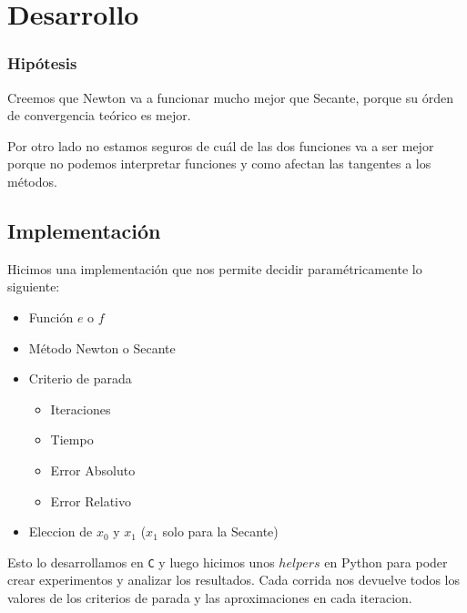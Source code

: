 \section{Desarrollo}

\subsubsection{Hipótesis}
Creemos que Newton va a funcionar mucho mejor que Secante, porque su órden de
convergencia teórico es mejor.

Por otro lado no estamos seguros de cuál de las dos funciones va a ser mejor
porque no podemos interpretar funciones y como afectan las tangentes a los
métodos.

\subsection{Implementación}

Hicimos una implementación que nos permite decidir paramétricamente lo siguiente:

\begin{itemize}
    \item Función $e$ o $f$
    \item Método Newton o Secante
    \item Criterio de parada
    \begin{itemize}
        \item Iteraciones
        \item Tiempo
        \item Error Absoluto
        \item Error Relativo
    \end{itemize}
    \item Eleccion de $x_0$ y $x_1$ ($x_1$ solo para la Secante)
\end{itemize}

Esto lo desarrollamos en \verb|C| y luego hicimos unos $helpers$ en Python para poder
crear experimentos y analizar los resultados. Cada corrida nos devuelve todos
los valores de los criterios de parada y las aproximaciones en cada iteracion.\\

